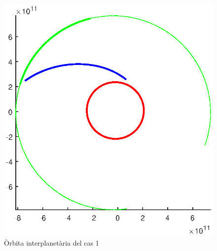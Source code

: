 \begin{figure}[H]
	\centering
	\includegraphics[scale=0.8]{./plots/cas1}
	\caption{Òrbita interplanetària del cas 1}
\end{figure}

